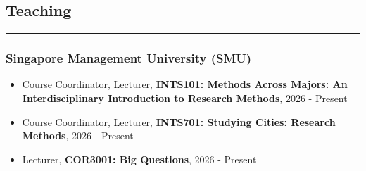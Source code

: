 \documentclass[10pt,a4paper]{article}
\begin{document}
\begin{small}







\subsection*{Teaching}
\hrule
\vspace{0.2cm}

\subsubsection*{Singapore Management University (SMU)}
\begin{itemize}
\item Course Coordinator, Lecturer, \textbf{INTS101: Methods Across Majors: An Interdisciplinary Introduction to Research Methods}, 2026 - Present
\item Course Coordinator, Lecturer, \textbf{INTS701: Studying Cities: Research Methods}, 2026 - Present%
\item Lecturer, \textbf{COR3001: Big Questions}, 2026 - Present%
\end{itemize}


\end{small}
\end{document}
